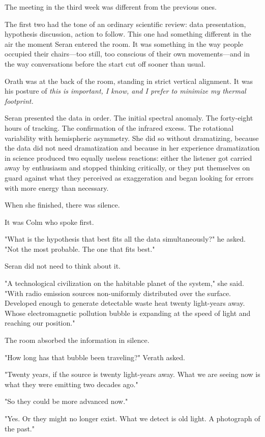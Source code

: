 \documentclass[11pt,a5paper,twoside]{book}
\begin{document}
The meeting in the third week was different from the previous ones.

The first two had the tone of an ordinary scientific review: data presentation, hypothesis discussion, action to follow. This one had something different in the air the moment Seran entered the room. It was something in the way people occupied their chairs—too still, too conscious of their own movements—and in the way conversations before the start cut off sooner than usual.

Orath was at the back of the room, standing in strict vertical alignment. It was his posture of \textit{this is important, I know, and I prefer to minimize my thermal footprint.}

Seran presented the data in order. The initial spectral anomaly. The forty-eight hours of tracking. The confirmation of the infrared excess. The rotational variability with hemispheric asymmetry. She did so without dramatizing, because the data did not need dramatization and because in her experience dramatization in science produced two equally useless reactions: either the listener got carried away by enthusiasm and stopped thinking critically, or they put themselves on guard against what they perceived as exaggeration and began looking for errors with more energy than necessary.

When she finished, there was silence.

It was Colm who spoke first.

"What is the hypothesis that best fits all the data simultaneously?" he asked. "Not the most probable. The one that fits best."

Seran did not need to think about it.

"A technological civilization on the habitable planet of the system," she said. "With radio emission sources non-uniformly distributed over the surface. Developed enough to generate detectable waste heat twenty light-years away. Whose electromagnetic pollution bubble is expanding at the speed of light and reaching our position."

The room absorbed the information in silence.

"How long has that bubble been traveling?" Verath asked.

"Twenty years, if the source is twenty light-years away. What we are seeing now is what they were emitting two decades ago."

"So they could be more advanced now."

"Yes. Or they might no longer exist. What we detect is old light. A photograph of the past."
\end{document}
